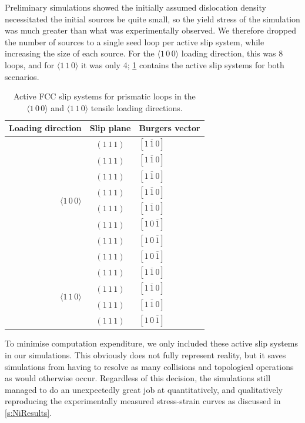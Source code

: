 Preliminary simulations showed the initially assumed dislocation density necessitated the initial sources be quite small, so the yield stress of the simulation was much greater than what was experimentally observed. We therefore dropped the number of sources to a single seed loop per active slip system, while increasing the size of each source. For the $\langle 1\, 0\, 0 \rangle$ loading direction, this was 8 loops, and for $\langle 1\, 1\, 0 \rangle$ it was only 4; \cref{t:slipSystems} contains the active slip systems for both scenarios.
\begin{table}
    \centering
    \caption{Active FCC slip systems for prismatic loops in the $\langle 1\, 0\, 0 \rangle$ and $\langle 1\, 1\, 0 \rangle$ tensile loading directions.}
    \label{t:slipSystems}
    \begin{tabular}{rcl}
        \toprule
        Loading direction                            & Slip plane    & Burgers vector           \\
        \midrule
        \multirow{8}{*}{$\langle 1\, 0\, 0 \rangle$} & $(1\, 1\, 1)$ & $[1\, \overline{1}\, 0]$ \\
                                                     & $(1\, 1\, 1)$ & $[1\, \overline{1}\, 0]$ \\
                                                     & $(1\, 1\, 1)$ & $[1\, \overline{1}\, 0]$ \\
                                                     & $(1\, 1\, 1)$ & $[1\, \overline{1}\, 0]$ \\
                                                     & $(1\, 1\, 1)$ & $[1\, \overline{1}\, 0]$ \\
                                                     & $(1\, 1\, 1)$ & $[1\, 0\, \overline{1}]$ \\
                                                     & $(1\, 1\, 1)$ & $[1\, 0\, \overline{1}]$ \\
                                                     & $(1\, 1\, 1)$ & $[1\, 0\, \overline{1}]$ \\
        \midrule
        \multirow{4}{*}{$\langle 1\, 1\, 0 \rangle$} & $(1\, 1\, 1)$ & $[1\, \overline{1}\, 0]$ \\
                                                     & $(1\, 1\, 1)$ & $[1\, \overline{1}\, 0]$ \\
                                                     & $(1\, 1\, 1)$ & $[1\, \overline{1}\, 0]$ \\
                                                     & $(1\, 1\, 1)$ & $[1\, 0\, \overline{1}]$ \\
        \bottomrule
    \end{tabular}
\end{table}
To minimise computation expenditure, we only included these active slip systems in our simulations. This obviously does not fully represent reality, but it saves simulations from having to resolve as many collisions and topological operations as would otherwise occur. Regardless of this decision, the simulations still managed to do an unexpectedly great job at quantitatively, and qualitatively reproducing the experimentally measured stress-strain curves as discussed in \cref{s:NiResults}.

